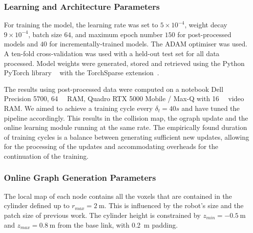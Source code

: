 \subsubsection{Learning and Architecture Parameters}
\label{ssubsec:learning_params}

For training the model, the learning rate was set to $5\times10^{-4}$, weight decay $9\times 10^{-4}$, batch size $64$, and maximum epoch number $150$ for post-processed models and $40$ for incrementally-trained models. The ADAM optimiser was used. A ten-fold cross-validation was used with a held-out test set for all data processed. Model weights were generated, stored and retrieved using the Python PyTorch library ~\cite{paszke2017automatic} with the TorchSparse extension~\cite{tang2022torchsparse}. 

The results using post-processed data were computed on a notebook Dell Precision 5700, \qty{64}{\giga\byte} RAM, Quadro RTX 5000 Mobile / Max-Q with \qty{16}{\giga\byte} video RAM. We aimed to achieve a training cycle every $\delta_t = 40s$ and have tuned the pipeline accordingly. This results in the collision map, the \ac{ograph} update and the online learning module running at the same rate. The empirically found duration of training cycles is a balance between generating sufficient new updates, allowing for the processing of the updates and accommodating overheads for the continuation of the training. 

\subsubsection{Online Graph Generation Parameters}
The local map of each node contains all the voxels that are contained in the cylinder defined up to $r_{max}=\qty{2}{\m}$. This is influenced by the robot's size and the patch size of previous work. The cylinder height is constrained by $z_{min} = \qty{-0.5}{\m}$ and $z_{max} = \qty{0.8}{\m}$ from the base link, with \qty{0.2}{\m} padding. 